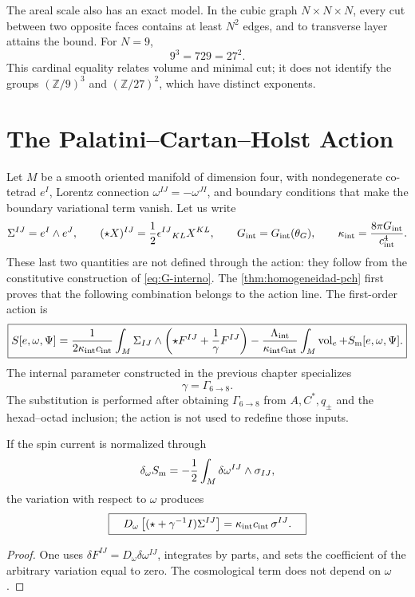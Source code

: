The areal scale also has an exact model.  In the cubic graph
\(N\times N\times N\), every cut between two opposite faces contains at least
\(N^2\) edges, and to transverse layer attains the bound.  For \(N=9\),
\[
 9^3=729=27^2.
\]
This cardinal equality relates volume and minimal cut; it does not identify the
groups \((\mathbb Z/9)^3\) and \((\mathbb Z/27)^2\), which have distinct
exponents.

\section{The Palatini--Cartan--Holst Action}

Let \(M\) be a smooth oriented manifold of dimension four, with nondegenerate
co-tetrad \(e^I\), Lorentz connection
\(\omega^{IJ}=-\omega^{JI}\), and boundary conditions that make the boundary
variational term vanish.  Let us write
\[
 \Sigma^{IJ}=e^I\wedge e^J,\qquad
 (\star X)^{IJ}=\frac12\epsilon^{IJ}{}_{KL}X^{KL},
 \qquad
 G_{\rm int}=G_{\rm int}(\theta_G),\qquad
 \kappa_{\rm int}=\frac{8\pi G_{\rm int}}{c_{\rm int}^{4}}.
\]
These last two quantities are not defined through the action: they follow from
the constitutive construction of \cref{eq:G-interno}. The
\cref{thm:homogeneidad-pch} first proves that the following combination
belongs to the action line.
The first-order action is
\[
\boxed{
 S[e,\omega,\Psi]
 =\frac1{2\kappa_{\rm int}c_{\rm int}}\int_M
 \Sigma_{IJ}\wedge
 \left(\star F^{IJ}+\frac1\gamma F^{IJ}\right)
 -\frac{\Lambda_{\rm int}}{\kappa_{\rm int}c_{\rm int}}
  \int_M\operatorname{vol}_e
 +S_{\rm m}[e,\omega,\Psi].}
\]
The internal parameter constructed in the previous chapter specializes
\[
 \gamma=\Gamma_{6\to8}.
\]
The substitution is performed after obtaining
\(\Gamma_{6\to8}\) from \(A,C^\ast,q_\pm\) and the hexad--octad inclusion; the action is not used to redefine those inputs.

\begin{theorem}
\label{thm:cartan-holst-rev6}
If the spin current is normalized through
\[
 \delta_\omega S_{\rm m}
 =-\frac12\int_M\delta\omega^{IJ}\wedge\sigma_{IJ},
\]
the variation with respect to \(\omega\) produces
\[
 \boxed{\quad
 D_\omega
 \left[(\star+\gamma^{-1}I)\Sigma^{IJ}\right]
 =\kappa_{\rm int}c_{\rm int}\,\sigma^{IJ}.
 \quad}
\]
\end{theorem}

\begin{proof}
One uses \(\delta F^{IJ}=D_\omega\delta\omega^{IJ}\), integrates by parts, and
sets the coefficient of the arbitrary variation equal to zero.  The cosmological
term does not depend on \(\omega\).
\end{proof}


